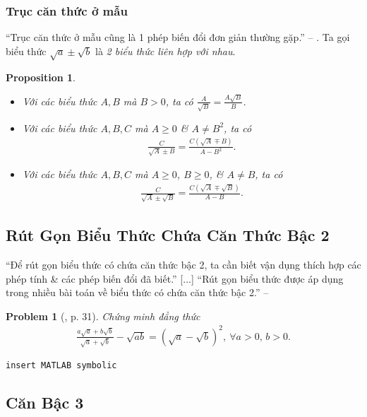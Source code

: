 \documentclass{article}
\numberwithin{equation}{section}
\newtheorem{problem}{Problem}[section]
\newtheorem{proposition}{Proposition}[section]
\begin{document}
\subsubsection{Trục căn thức ở mẫu}
``Trục căn thức ở mẫu cũng là 1 phép biến đổi đơn giản thường gặp.'' -- \cite[p. 28]{SGK_Toan_9_tap_1}. Ta gọi biểu thức $\sqrt{a}\pm\sqrt{b}$ là \textit{2 biểu thức liên hợp với nhau}.

\begin{proposition}
	\begin{itemize}
		\item[(a)] Với các biểu thức $A,B$ mà $B > 0$, ta có $\frac{A}{\sqrt{B}} = \frac{A\sqrt{B}}{B}$.
		\item[(b)] Với các biểu thức $A,B,C$ mà $A\ge 0$ \& $A\ne B^2$, ta có
		\begin{align*}
			\frac{C}{\sqrt{A}\pm B} = \frac{C(\sqrt{A}\mp B)}{A - B^2}.
		\end{align*}
		\item[(c)] Với các biểu thức $A,B,C$ mà $A\ge 0$, $B\ge 0$, \& $A\ne B$, ta có
		\begin{align*}
			\frac{C}{\sqrt{A}\pm\sqrt{B}} = \frac{C(\sqrt{A}\mp\sqrt{B})}{A - B}.
		\end{align*}
	\end{itemize}
\end{proposition}

\subsection{Rút Gọn Biểu Thức Chứa Căn Thức Bậc 2}
``Để rút gọn biểu thức có chứa căn thức bậc 2, ta cần biết vận dụng thích hợp các phép tính \& các phép biến đổi đã biết.'' [$\ldots$] ``Rút gọn biểu thức được áp dụng trong nhiều bài toán về biểu thức có chứa căn thức bậc 2.'' -- \cite[p. 31]{SGK_Toan_9_tap_1}

\begin{problem}[\cite{SGK_Toan_9_tap_1}, p. 31]
	Chứng minh đẳng thức
	\begin{align*}
		\frac{a\sqrt{a} + b\sqrt{b}}{\sqrt{a} + \sqrt{b}} - \sqrt{ab} = \left(\sqrt{a} - \sqrt{b}\right)^2,\ \forall a > 0,\,b > 0.
	\end{align*}
\end{problem}

\texttt{insert MATLAB symbolic}

\subsection{Căn Bậc 3}
\end{document}

